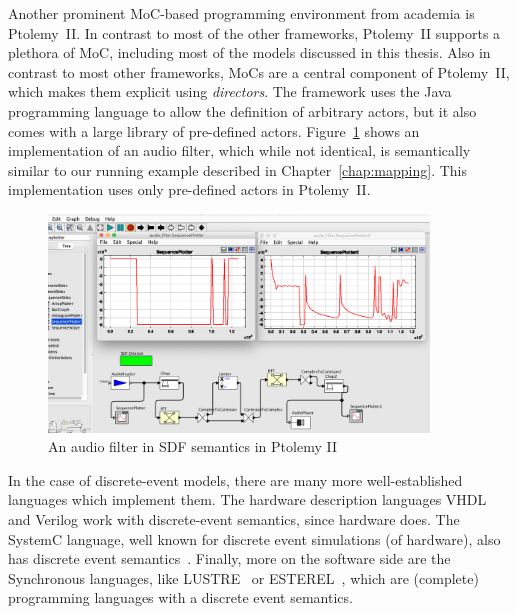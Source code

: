 Another prominent \ac{MoC}-based programming environment from academia is Ptolemy~II\cite{Ptolemaeus:14:SystemDesign}. 
In contrast to most of the other frameworks, Ptolemy~II supports a plethora of \ac{MoC}, including most of the models discussed in this thesis. 
Also in contrast to most other frameworks, \acp{MoC} are a central component of Ptolemy~II, which makes them explicit using \emph{directors}.
The framework uses the Java programming language to allow the definition of arbitrary actors, but it also comes with a large library of pre-defined actors.
Figure~\ref{fig:audio_filter_ptolemy} shows an implementation of an audio filter, which while not identical, is semantically similar to our running example described in Chapter~\ref{chap:mapping}.
This implementation uses only pre-defined actors in Ptolemy~II.

\begin{figure}[t]
	\centering
	\includegraphics[width=0.9\textwidth]{figures/audio_filter_ptolemy_screenshot.png}
	\caption{An audio filter in \ac{SDF} semantics in Ptolemy II}
	\label{fig:audio_filter_ptolemy}
\end{figure}

In the case of discrete-event models, there are many more well-established languages which implement them.
The hardware description languages VHDL and Verilog work with discrete-event semantics, since hardware does. 
The SystemC language, well known for discrete event simulations (of hardware), also has discrete event semantics~\cite{semantics_systemc}.
Finally, more on the software side are the Synchronous languages, like LUSTRE~\cite{lustre} or ESTEREL~\cite{esterel}, which are (complete) programming languages with a discrete event semantics.

